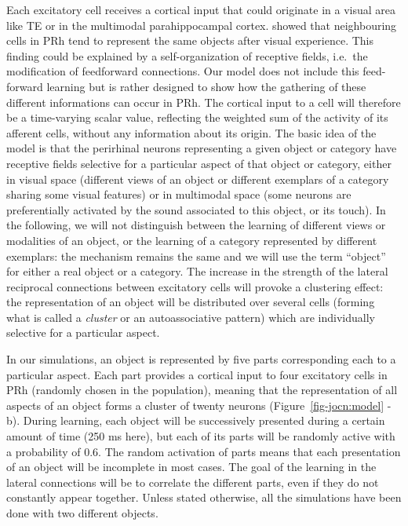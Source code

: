 \documentclass[
  11pt,
  a4paper,
]{scrbook}
\begin{document}
Each excitatory cell receives a cortical input that could originate in a
visual area like TE or in the multimodal parahippocampal cortex. showed
that neighbouring cells in PRh tend to represent the same objects after
visual experience. This finding could be explained by a
self-organization of receptive fields, i.e.~the modification of
feedforward connections. Our model does not include this feed-forward
learning but is rather designed to show how the gathering of these
different informations can occur in PRh. The cortical input to a cell
will therefore be a time-varying scalar value, reflecting the weighted
sum of the activity of its afferent cells, without any information about
its origin. The basic idea of the model is that the perirhinal neurons
representing a given object or category have receptive fields selective
for a particular aspect of that object or category, either in visual
space (different views of an object or different exemplars of a category
sharing some visual features) or in multimodal space (some neurons are
preferentially activated by the sound associated to this object, or its
touch). In the following, we will not distinguish between the learning
of different views or modalities of an object, or the learning of a
category represented by different exemplars: the mechanism remains the
same and we will use the term ``object'' for either a real object or a
category. The increase in the strength of the lateral reciprocal
connections between excitatory cells will provoke a clustering effect:
the representation of an object will be distributed over several cells
(forming what is called a \emph{cluster} or an autoassociative pattern)
which are individually selective for a particular aspect.

In our simulations, an object is represented by five parts corresponding
each to a particular aspect. Each part provides a cortical input to four
excitatory cells in PRh (randomly chosen in the population), meaning
that the representation of all aspects of an object forms a cluster of
twenty neurons (Figure~\ref{fig-jocn:model} - b). During learning, each
object will be successively presented during a certain amount of time
(250 ms here), but each of its parts will be randomly active with a
probability of 0.6. The random activation of parts means that each
presentation of an object will be incomplete in most cases. The goal of
the learning in the lateral connections will be to correlate the
different parts, even if they do not constantly appear together. Unless
stated otherwise, all the simulations have been done with two different
objects.
\end{document}
